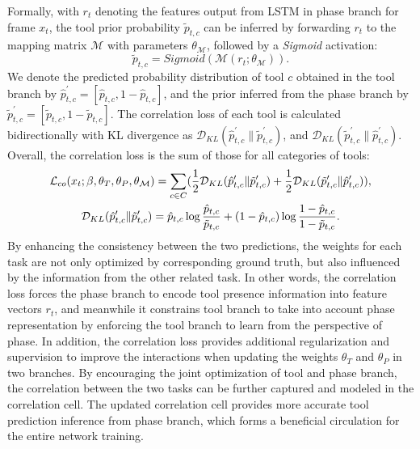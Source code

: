 \documentclass{elsarticle}
\begin{document}
Formally, with $r_t$ denoting the features output from LSTM in phase branch for frame $x_t$, the tool prior probability $\tilde{p}_{t,c}$ can be inferred by forwarding $r_t$ to the mapping matrix $\mathcal{M}$ with parameters $\theta_\mathcal{M}$, followed by a \textit{Sigmoid} activation:
\begin{equation}
	\label{eq:mapping}
	\tilde{p}_{t,c} = \textit{Sigmoid}(\mathcal{M}(r_t;\theta_\mathcal{M})).
\end{equation}
We denote the predicted probability distribution of tool $c$ obtained in the tool branch by $\hat{p}^\prime_{t,c} = [\hat{p}_{t,c}, 1- \hat{p}_{t,c}]$, and the prior inferred from the phase branch by $\tilde{p}^\prime_{t,c} = [\tilde{p}_{t,c}, 1- \tilde{p}_{t,c}]$.
The correlation loss of each tool is calculated bidirectionally with KL divergence as $\mathcal{D}_{KL} (\hat{p}^\prime_{t,c} \| \tilde{p}^\prime_{t,c})$, and $\mathcal{D}_{KL} (\tilde{p}^\prime_{t,c} \| \hat{p}^\prime_{t,c})$. Overall, the correlation loss is the sum of those for all categories of tools:
\begin{equation}
	\label{eq:kl}
	\centering
	\begin{gathered}
		\mathcal{L}_{co}(x_t;\beta,\theta_T,\theta_P,\theta_\mathcal{M})=\sum\limits_{c \in C} (\frac{1}{2} \mathcal{D}_{KL} (\hat{p}^\prime_{t,c} \| \tilde{p}^\prime_{t,c})  +  \frac{1}{2} \mathcal{D}_{KL} (\tilde{p}^\prime_{t,c} \| \hat{p}^\prime_{t,c}) ), \\
		\mathcal{D}_{KL}(\hat{p}^\prime_{t,c} \| \tilde{p}^\prime_{t,c})= \hat{p}_{t,c} \log\frac{\hat{p}_{t,c}}{\tilde{p}_{t,c}} + (1-\hat{p}_{t,c}) \log\frac{1-\hat{p}_{t,c}}{1-\tilde{p}_{t,c}} .\\
	\end{gathered}
\end{equation}
By enhancing the consistency between the two predictions, the weights for each task are not only optimized by corresponding ground truth, but also influenced by the information from the other related task.
In other words, the correlation loss forces the phase branch to encode tool presence information into feature vectors $r_t$, and meanwhile it constrains tool branch to take into account phase representation by enforcing the tool branch to learn from the perspective of phase.
In addition, the correlation loss provides additional regularization and supervision to improve the interactions when updating the weights $\theta_T$ and $\theta_P$ in two branches.
By encouraging the joint optimization of tool and phase branch, the correlation between the two tasks can be further captured
and modeled in the correlation cell.
The updated correlation cell provides more accurate tool prediction inference from phase branch, which forms a beneficial circulation for the entire network training.
\end{document}
